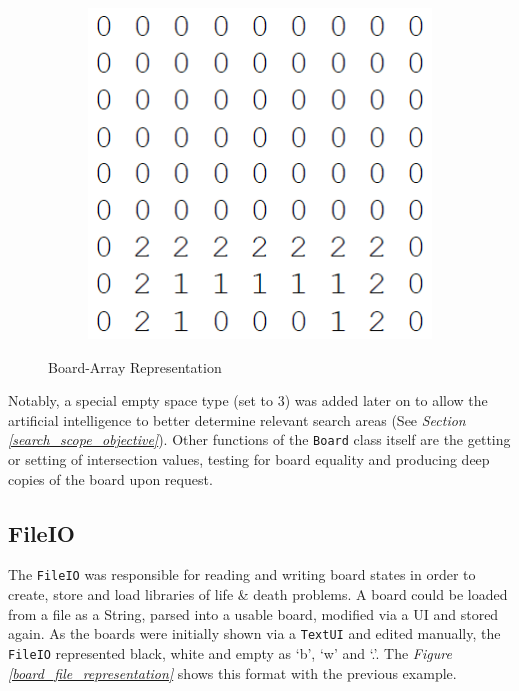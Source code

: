 \documentclass{l3proj}
\begin{document}
\begin{figure}[H]
\begin{subfigure}[b]{0.4\textwidth}
		\includegraphics[width=\textwidth]{Images/S33Board_Rep_Example_text}
	\end{subfigure}
\caption{Board-Array Representation}
\label{board_representation}
\end{figure}

Notably, a special empty space type (set to 3) was added later on to allow the artificial intelligence to better determine relevant search areas (See \textit{Section  \ref{search_scope_objective}}). Other functions of the \texttt{Board} class itself are the getting or setting of intersection values, testing for board equality and producing deep copies of the board upon request. 

\subsection{FileIO}

The \texttt{FileIO} was responsible for reading and writing board states in order to create, store and load libraries of life \& death problems. A board could be loaded from a file as a String, parsed into a usable board, modified via a UI and stored again. As the boards were initially shown via a \texttt{TextUI} and edited manually, the \texttt{FileIO} represented black, white and empty as `b', `w' and `.'. The \textit{Figure  \ref{board_file_representation}} shows this format with the previous example.
\end{document}
